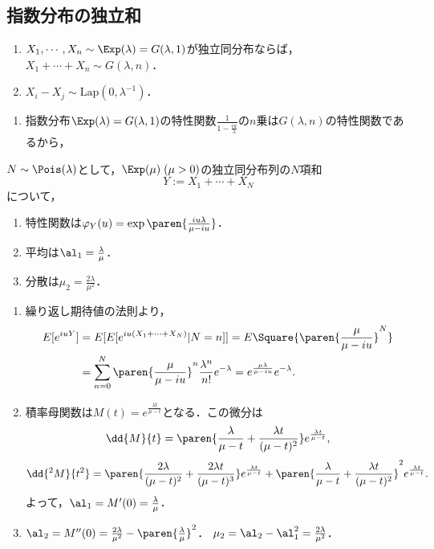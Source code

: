 \documentclass[uplatex,dvipdfmx]{jsreport}
\begin{document}
\subsection{指数分布の独立和}

\begin{proposition}\mbox{}
    \begin{enumerate}
        \item $X_1,\cdots,X_n\sim\Exp(\lambda)=G(\lambda,1)$が独立同分布ならば，$X_1+\cdots+X_n\sim G(\lambda,n)$．
        \item $X_i-X_j\sim\mathrm{Lap}(0,\lambda^{-1})$．
    \end{enumerate}
\end{proposition}
\begin{Proof}\mbox{}
    \begin{enumerate}
        \item 指数分布$\Exp(\lambda)=G(\lambda,1)$の特性関数$\frac{1}{1-\frac{iu}{\lambda}}$の$n$乗は$G(\lambda,n)$の特性関数であるから，
    \end{enumerate}
\end{Proof}

\begin{proposition}
    $N\sim\Pois(\lambda)$として，$\Exp(\mu)\;(\mu>0)$の独立同分布列の$N$項和
    \[Y:=X_1+\cdots+X_N\]
    について，
    \begin{enumerate}
        \item 特性関数は$\varphi_Y(u)=\exp\paren{\frac{iu\lambda}{\mu-iu}}$．
        \item 平均は$\al_1=\frac{\lambda}{\mu}$．
        \item 分散は$\mu_2=\frac{2\lambda }{\mu^2}$．
    \end{enumerate}
\end{proposition}
\begin{Proof}\mbox{}
    \begin{enumerate}
        \item 繰り返し期待値の法則より，
        \begin{align*}
            E[e^{iuY}]&=E[E[e^{iu(X_1+\cdots+X_N)}|N=n]]=E\Square{\paren{\frac{\mu}{\mu-iu}}^N}\\
            &=\sum_{n=0}^N\paren{\frac{\mu}{\mu-iu}}^n\frac{\lambda^n}{n!}e^{-\lambda}=e^{\frac{\mu\lambda}{\mu-iu}}e^{-\lambda}.
        \end{align*}
        \item 積率母関数は$M(t)=e^{\frac{\lambda t}{\mu-t}}$となる．この微分は
        \[\dd{M}{t}=\paren{\frac{\lambda}{\mu-t}+\frac{\lambda t}{(\mu-t)^2}}e^{\frac{\lambda t}{\mu-t}},\]
        \[\dd{^2M}{t^2}=\paren{\frac{2\lambda}{(\mu-t)^2}+\frac{2\lambda t}{(\mu-t)^3}}e^{\frac{\lambda t}{\mu-t}}+\paren{\frac{\lambda}{\mu-t}+\frac{\lambda t}{(\mu-t)^2}}^2e^{\frac{\lambda t}{\mu-t}}.\]
        よって，$\al_1=M'(0)=\frac{\lambda}{\mu}$．
        \item $\al_2=M''(0)=\frac{2\lambda}{\mu^2}-\paren{\frac{\lambda}{\mu}}^2$．
        $\mu_2=\al_2-\al_1^2=\frac{2\lambda }{\mu^2}$．
    \end{enumerate}
\end{Proof}
\end{document}
